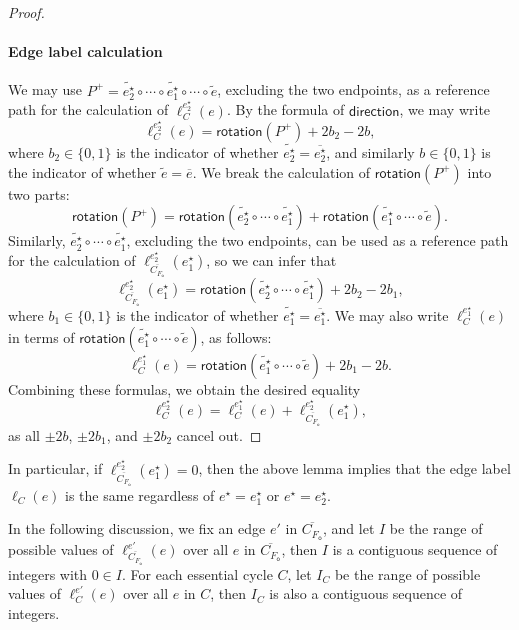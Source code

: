 \documentclass{theoretics}
\newcommand{\FO}{F_\mathsf{o}}
\newcommand{\rotation}{\mathsf{rotation}}
\newcommand{\direction}{\mathsf{direction}}
\newcommand{\eref}{e^\star}
\begin{document}
\begin{proof}
\paragraph{Edge label calculation}
We may use $P^+=\tilde{\eref_2} \circ \cdots \circ \tilde{\eref_1} \circ \cdots \circ \tilde{e}$, excluding the two endpoints, as a reference path for the calculation of $\ell_C^{\eref_2}(e)$.
By the formula of $\direction$, we may write 
\[\ell_C^{\eref_2}(e) = \rotation(P^+) +2b_2 - 2b,\]
where $b_2 \in \{0,1\}$ is the indicator of whether $\tilde{\eref_2} = \overline{\eref_2}$, and similarly $b \in \{0,1\}$ is the indicator of whether $\tilde{e} = \overline{e}$. We  break the calculation of $\rotation(P^+)$ into two parts:
\[\rotation(P^+) = \rotation(\tilde{\eref_2} \circ \cdots \circ \tilde{\eref_1}) + \rotation(\tilde{\eref_1} \circ \cdots \circ \tilde{e}).\]
Similarly, $\tilde{\eref_2} \circ \cdots \circ \tilde{\eref_1}$, excluding the two endpoints, can be used as a reference path for the calculation of $\ell_{\overline{C_{\FO}}}^{\eref_2}(\eref_1)$, so we can infer that
\[\ell_{\overline{C_{\FO}}}^{\eref_2}(\eref_1) = \rotation(\tilde{\eref_2} \circ \cdots \circ \tilde{\eref_1}) +2b_2 - 2b_1,\]
where $b_1 \in \{0,1\}$ is the indicator of whether $\tilde{\eref_1} = \overline{\eref_1}$. We may also write $\ell_C^{\eref_1}(e)$ in terms of $\rotation(\tilde{\eref_1} \circ \cdots \circ \tilde{e})$, as follows:
\[\ell_C^{\eref_1}(e) = \rotation(\tilde{\eref_1} \circ \cdots \circ \tilde{e}) +2b_1 - 2b.\]
Combining these formulas, we obtain the desired equality \[\ell_C^{\eref_2}(e)=\ell_C^{\eref_1}(e) + \ell_{\overline{C_{\FO}}}^{\eref_2}(\eref_1),\] 
as all $\pm2b$, $\pm2b_1$, and $\pm2b_2$ cancel out. 
\end{proof}

 In particular, if $\ell_{\overline{C_{\FO}}}^{\eref_2}(\eref_1) = 0$, then the above lemma implies that the edge label $\ell_C(e)$ is the same regardless of $\eref = \eref_1$ or $\eref = \eref_2$. 

In the following discussion, we fix an edge $e'$ in $\overline{C_{\FO}}$, and let $I$ be the range of possible values of $\ell_{\overline{C_{\FO}}}^{e'}(e)$ over all $e$ in $\overline{C_{\FO}}$, then $I$ is a contiguous sequence of integers with $0 \in I$. For each essential cycle $C$, let $I_C$ be the range of possible values of $\ell_C^{e'}(e)$  over all $e$ in $C$, then $I_C$ is also a contiguous sequence of integers. 
\end{document}
